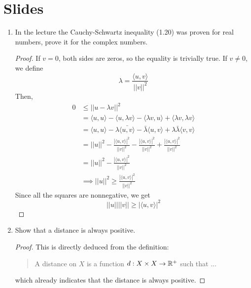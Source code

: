 \section{Slides}
\begin{enumerate}
	\item In the lecture the Cauchy-Schwartz inequality (1.20) was proven for real numbers, prove it for the complex numbers.
	\begin{proof}
	If \(v=0\), both sides are zeros, so the equality is trivially true.
	If \(v\neq0\), we define
	\[\lambda=\frac{\langle u,v\rangle}{||v||^2}  \]
	Then,
	\begin{align*}
	0&\leq ||u-\lambda v||^2\\
	&=\langle u,u \rangle-\langle u,\lambda v\rangle-\langle\lambda v,u \rangle+\langle \lambda v,\lambda v\rangle\\
	&=\langle u,u \rangle-\lambda\bar{\langle u,v \rangle}-\bar\lambda\langle u,v \rangle+\lambda\bar\lambda \langle v,v \rangle\\
	&=||u||^2-\frac{|\langle u,v \rangle|^2}{||v||^2}-\frac{|\langle u,v \rangle|^2}{||v||^2}+\frac{|\langle u,v \rangle|^2}{||v||^2}\\
	&=||u||^2-\frac{|\langle u,v \rangle|^2}{||v||^2}\\
	&\implies ||u||^2\geq\frac{|\langle u,v \rangle|^2}{||v||^2} 
	\end{align*}
	Since all the squares are nonnegative, we get
	\[||u||||v||\geq |\langle u,v \rangle|^2 \]
	\end{proof}
    \item Show that a distance is always positive.
	\begin{proof}
	This is directly deduced from the definition:
	\begin{quote}
		A distance on $X$ is a function \(d: X\times X\to\mathbb{R}^+\) such that ...
	\end{quote}
	which already indicates that the distance is always positive.
	\end{proof}
\end{enumerate}


